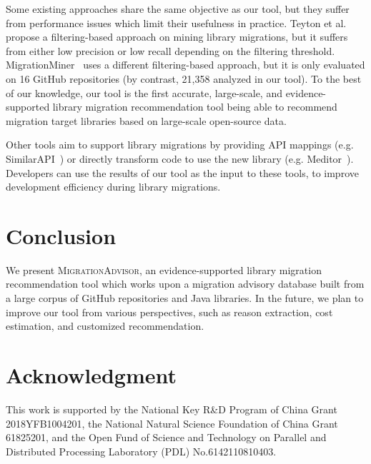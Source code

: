 \documentclass[conference,10pt]{IEEEtran}
\begin{document}
Some existing approaches share the same objective as our tool, but they suffer from performance issues which limit their usefulness in practice.
Teyton et al.~\cite{teyton2012mining} propose a filtering-based approach on mining library migrations, but it suffers from either low precision or low recall depending on the filtering threshold.
MigrationMiner~\cite{alrubaye2019migrationminer} uses a different filtering-based approach, but it is only evaluated on 16 GitHub repositories (by contrast, 21,358 analyzed in our tool). 
To the best of our knowledge, our tool is the first accurate, large-scale, and evidence-supported library migration recommendation tool being able to recommend migration target libraries based on large-scale open-source data.

Other tools aim to support library migrations by providing API mappings (e.g. SimilarAPI~\cite{chen2020similarapi}) or directly transform code to use the new library (e.g. Meditor~\cite{xu2019meditor}). 
Developers can use the results of our tool as the input to these tools, to improve development efficiency during library migrations.

\section{Conclusion}

We present \textsc{MigrationAdvisor}, an evidence-supported library migration recommendation tool which works upon a migration advisory database built from a large corpus of GitHub repositories and Java libraries.
In the future, we plan to improve our tool from various perspectives, such as reason extraction, cost estimation, and customized recommendation.

\section*{Acknowledgment}

This work is supported by the National Key R\&D Program of China Grant 2018YFB1004201, the National Natural Science Foundation of China Grant 61825201, and the Open Fund of Science and Technology on Parallel and Distributed Processing Laboratory (PDL) No.6142110810403.



\end{document}
